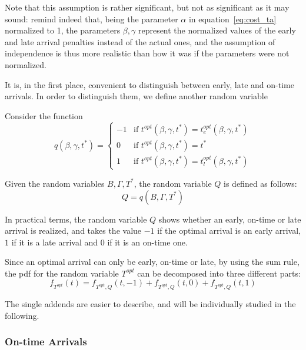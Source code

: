 Note that this assumption is rather significant,
but not as significant as it may sound:
remind indeed that, being the parameter \(\alpha\) in equation~\eqref{eq:cost_ta} normalized to 1,
the parameters \(\beta, \gamma\) represent the normalized values of the early and late arrival penalties instead of the actual ones,
and the assumption of independence is thus more realistic than how it was if the parameters were not normalized.

It is, in the first place,
convenient to distinguish between early, late and on-time arrivals.
In order to distinguish them, we define another random variable
\begin{definition}
  Consider the function
  \begin{equation*}
    q(\beta, \gamma, t^*) =
    \begin{cases}
      -1 & \text{if } t^{opt}(\beta, \gamma, t^*) = t_e^{opt}(\beta, \gamma, t^*) \\
      0 & \text{if } t^{opt}(\beta, \gamma, t^*) = t^* \\
      1 & \text{if } t^{opt}(\beta, \gamma, t^*) = t_l^{opt}(\beta, \gamma, t^*)
    \end{cases}
  \end{equation*}

  Given the random variables \(B, \Gamma, T^*\), the random variable \(Q\) is defined as follows:
  \begin{equation*}
    Q  = q(B, \Gamma, T^*)
  \end{equation*}
\end{definition}

In practical terms, the random variable \(Q\) shows whether an early, on-time or late arrival is realized,
and takes the value \(-1\) if the optimal arrival is an early arrival,
\(1\) if it is a late arrival and \(0\) if it is an on-time one.

Since an optimal arrival can only be early, on-time or late,
by using the sum rule, the pdf for the random variable \(T^{opt}\) can be decomposed into three different parts:
\begin{equation}
  \label{eq:pdf-decomposed-q}
  f_{T^{opt}}(t) = f_{T^{opt}, Q}(t, -1) + f_{T^{opt}, Q}(t, 0) + f_{T^{opt}, Q}(t, 1)
\end{equation}

The single addends are easier to describe,
and will be individually studied in the following.

\subsubsection{On-time Arrivals}

